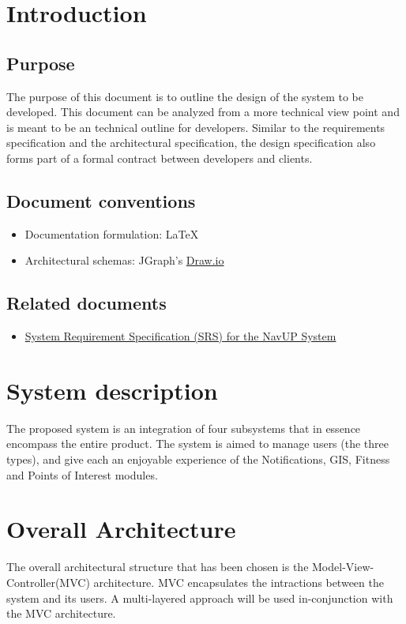 \documentclass{article}
\begin{document}
\tableofcontents{}	

	\newpage
	\section{Introduction}
		\subsection{Purpose}
		The purpose of this document is to outline the design of the system to be developed. This document can be analyzed from a more technical view point and is meant to be an technical outline for developers.  Similar to the requirements specification and the architectural specification, the design specification also forms part of a formal contract between developers and clients.
		\subsection{Document conventions}
			\begin{itemize}
				\item Documentation formulation:  LaTeX
				\item Architectural schemas: JGraph's \href{https://www.draw.io/}{Draw.io}
			\end{itemize}
		\subsection{Related documents}
			\begin{itemize}
				\item \href{http://www.cs.up.ac.za/files/COS301/Download/1528/}{System Requirement Specification (SRS) for the NavUP System}
			\end{itemize}
	\section{System description}

	The proposed system is an integration of four subsystems that in essence encompass the entire product. The system is aimed to manage users (the three types), and give each an enjoyable experience of the Notifications, GIS, Fitness and Points of Interest modules.  
	
	\section{Overall Architecture}
	{The overall architectural structure that has been chosen is the Model-View-Controller(MVC) architecture. MVC encapsulates the intractions between the system and its users. A multi-layered approach will be used in-conjunction with the MVC architecture.}
\end{document}

